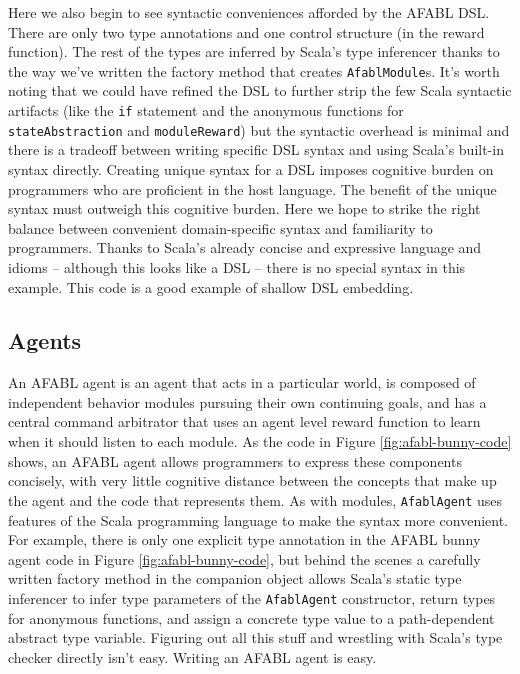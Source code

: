Here we also begin to see syntactic conveniences afforded by the AFABL DSL. There are only two type annotations and one control structure (in the reward function). The rest of the types are inferred by Scala's type inferencer thanks to the way we've written the factory method that creates {\tt AfablModule}s. It's worth noting that we could have refined the DSL to further strip the few Scala syntactic artifacts (like the {\tt if} statement and the anonymous functions for {\tt stateAbstraction} and {\tt moduleReward}) but the syntactic overhead is minimal and there is a tradeoff between writing specific DSL syntax and using Scala's built-in syntax directly. Creating unique syntax for a DSL imposes cognitive burden on programmers who are proficient in the host language. The benefit of the unique syntax must outweigh this cognitive burden. Here we hope to strike the right balance between convenient domain-specific syntax and familiarity to programmers. Thanks to Scala's already concise and expressive language and idioms -- although this looks like a DSL -- there is no special syntax in this example. This code is a good example of shallow DSL embedding.

\subsection{Agents}

An AFABL agent is an agent that acts in a particular world, is composed of independent behavior modules pursuing their own continuing goals, and has a central command arbitrator that uses an agent level reward function to learn when it should listen to each module. As the code in Figure \ref{fig:afabl-bunny-code} shows, an AFABL agent allows programmers to express these components concisely, with very little cognitive distance between the concepts that make up the agent and the code that represents them. As with modules, {\tt AfablAgent} uses features of the Scala programming language to make the syntax more convenient. For example, there is only one explicit type annotation in the AFABL bunny agent code in Figure \ref{fig:afabl-bunny-code}, but behind the scenes a carefully written factory method in the companion object allows Scala's static type inferencer to infer type parameters of the {\tt AfablAgent} constructor, return types for anonymous functions, and assign a concrete type value to a path-dependent abstract type variable. Figuring out all this stuff and wrestling with Scala's type checker directly isn't easy. Writing an AFABL agent is easy.

